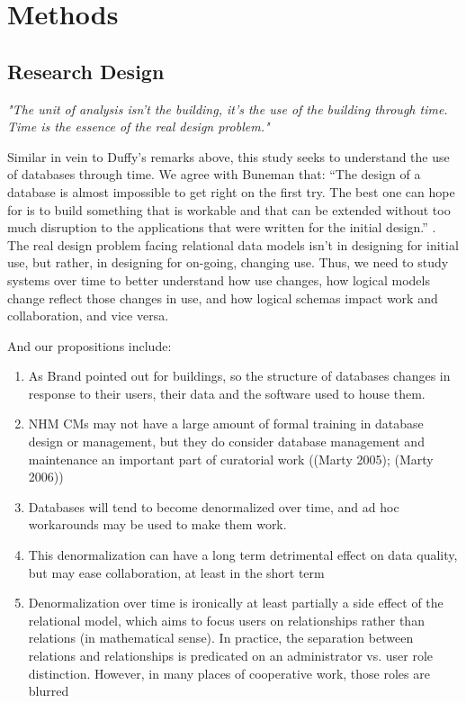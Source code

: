 \section{Methods}

\subsection{Research Design}
\textit{"The unit of analysis isn't the building, it's the use of the building through time. Time is the essence of the real design problem."} \cite{duffy1990measuring}

Similar in vein to Duffy's remarks above, this study seeks to understand the use of databases through time. We agree with Buneman that: “The design of a database is almost impossible to get right on the first try. The best one can hope for is to build something that is workable and that can be extended without too much disruption to the applications that were written for the initial design.”   \cite{buneman2008curated}. The real design problem facing relational data models isn't in designing for initial use, but rather, in designing for on-going, changing use.  Thus, we need to study systems over time to better understand how use changes, how logical models change reflect those changes in use, and how logical schemas impact work and collaboration, and vice versa.

And our propositions include:
\begin{enumerate}
\item As Brand pointed out for buildings, so the structure of databases changes in response to their users, their data and the software used to house them.
\item NHM CMs may not have a large amount of formal training in database design or management, but they do consider database management and maintenance an important part of curatorial work ((Marty 2005); (Marty 2006))
\item Databases will tend to become denormalized over time, and ad hoc workarounds may be used to make them work.
\item This denormalization can have a long term detrimental effect on data quality, but may ease collaboration, at least in the short term
\item Denormalization over time is ironically at least partially a side effect of the relational model, which aims to focus users on relationships rather than relations (in mathematical sense). In practice, the separation between relations and relationships is predicated on an administrator vs. user role distinction. However, in many places of cooperative work, those roles are blurred
\end{enumerate}

